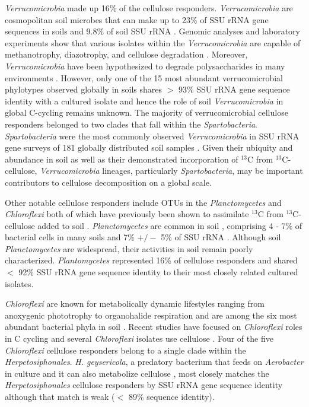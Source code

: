 \textit{Verrucomicrobia} made up 16\% of the cellulose responders.
\textit{Verrucomicrobia} are cosmopolitan soil microbes \citep{Bergmann_2011}
that can make up to 23\% of SSU rRNA gene sequences in soils
\citep{Bergmann_2011} and 9.8\% of soil SSU rRNA \citep{Buckley_2001}. Genomic
analyses and laboratory experiments show that various isolates
within the \textit{Verrucomicrobia} are capable of methanotrophy, diazotrophy,
and cellulose degradation \citep{Wertz_2011,Otsuka_2012}. Moreover,
\textit{Verrucomicrobia} have been hypothesized to degrade polysaccharides in
many environments \citep{Fierer_2013,10543821,Herlemann_2013}. However, only
one of the 15 most abundant verrucomicrobial phylotypes observed globally in
soils shares $>$ 93\% SSU rRNA gene sequence identity with a cultured isolate
\citep{Bergmann_2011} and hence the role of soil \textit{Verrucomicrobia} in
global C-cycling remains unknown. The majority of verrucomicrobial cellulose
responders belonged to two clades that fall within the \textit{Spartobacteria}.
\textit{Spartobacteria} were the most commonly observed
\textit{Verrucomicrobia} in SSU rRNA gene surveys of
181 globally distributed soil samples \citep{Bergmann_2011}. Given their ubiquity and abundance
in soil as well as their demonstrated incorporation of $^{13}$C from
$^{13}$C-cellulose, \textit{Verrucomicrobia} lineages, particularly
\textit{Spartobacteria}, may be important contributors to cellulose
decomposition on a global scale. 

Other notable cellulose responders include OTUs in the \textit{Planctomycetes}
and \textit{Chloroflexi} both of which have previously been shown to
assimilate $^{13}$C from $^{13}$C-cellulose added to soil
\citep{Schellenberger_2010}. \textit{Planctomycetes} are common in soil
\citep{Jannsen2006}, comprising 4 - 7\% of bacterial cells in many soils
\citep{Zarda_1997,Chatzinotas_1998} and 7\% $+/-$ 5\% of SSU rRNA
\citep{buckley_2003}. Although soil \textit{Planctomycetes} are widespread,
their activities in soil remain poorly characterized. \textit{Plantomycetes}
represented 16\% of cellulose responders and shared $<$ 92\% SSU rRNA gene
sequence identity to their most closely related cultured isolates.

\textit{Chloroflexi} are known for metabolically dynamic lifestyles ranging
from anoxygenic phototrophy to organohalide respiration \citep{Hug_2013} and
are among the six most abundant bacterial phyla in soil \citep{Janssen2006}.
Recent studies have focused on \textit{Chloroflexi} roles in C cycling
\citep{Hug_2013,Goldfarb_2011,Cole_2013} and several \textit{Chloroflexi}
isolates use cellulose \citep{Hug_2013,Goldfarb_2011,Cole_2013}. Four
of the five \textit{Chloroflexi} cellulose responders belong to a single clade
within the \textit{Herpetosiphonales}. \textit{H. geysericola}, a predatory
bacterium that feeds on \textit{Aerobacter} in culture and it can also
metabolize cellulose \citep{Lewin1970},  most closely matches the \textit{Herpetosiphonales}
cellulose responders by SSU rRNA gene sequence identity although that match is
weak ($<$ 89\% sequence identity).
 

